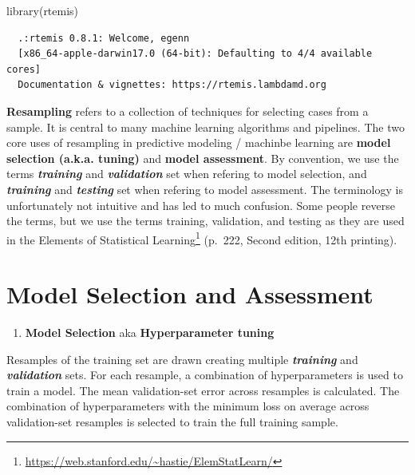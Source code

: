 \documentclass[
]{book}
\newenvironment{Shaded}{\begin{snugshade}}{\end{snugshade}}
\newcommand{\FunctionTok}[1]{\textcolor[rgb]{0.00,0.00,0.00}{#1}}
\newcommand{\NormalTok}[1]{#1}
\DeclareRobustCommand{\href}[2]{#2\footnote{\url{#1}}}
\providecommand{\tightlist}{%
  \setlength{\itemsep}{0pt}\setlength{\parskip}{0pt}}
\begin{document}
\begin{Shaded}
\begin{Highlighting}[]
\FunctionTok{library}\NormalTok{(rtemis)}
\end{Highlighting}
\end{Shaded}

\begin{verbatim}
  .:rtemis 0.8.1: Welcome, egenn
  [x86_64-apple-darwin17.0 (64-bit): Defaulting to 4/4 available cores]
  Documentation & vignettes: https://rtemis.lambdamd.org
\end{verbatim}

\textbf{Resampling} refers to a collection of techniques for selecting cases from a sample. It is central to many machine learning algorithms and pipelines. The two core uses of resampling in predictive modeling / machinbe learning are \textbf{model selection (a.k.a. tuning)} and \textbf{model assessment}. By convention, we use the terms \textbf{\emph{training}} and \textbf{\emph{validation}} set when refering to model selection, and \textbf{\emph{training}} and \textbf{\emph{testing}} set when refering to model assessment. The terminology is unfortunately not intuitive and has led to much confusion. Some people reverse the terms, but we use the terms training, validation, and testing as they are used in the \href{https://web.stanford.edu/~hastie/ElemStatLearn/}{Elements of Statistical Learning} (p.~222, Second edition, 12th printing).

\hypertarget{model-selection-and-assessment}{%
\section{Model Selection and Assessment}\label{model-selection-and-assessment}}

\begin{enumerate}
\def\labelenumi{\arabic{enumi}.}
\tightlist
\item
  \textbf{Model Selection} aka \textbf{Hyperparameter tuning}
\end{enumerate}

Resamples of the training set are drawn creating multiple \textbf{\emph{training}} and \textbf{\emph{validation}} sets. For each resample, a combination of hyperparameters is used to train a model. The mean validation-set error across resamples is calculated. The combination of hyperparameters with the minimum loss on average across validation-set resamples is selected to train the full training sample.
\end{document}
